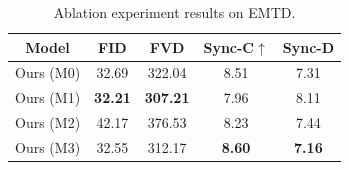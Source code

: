 \begin{table}[t]
        \centering
        \begin{tabular}{c|cccc}
        \toprule
            Model & FID & FVD  & Sync-C$\uparrow$ & Sync-D
            \\
            \midrule
            Ours (M0)       & 32.69 & 322.04 & 8.51 & 7.31 \\
            Ours (M1)       & \textbf{32.21} & \textbf{307.21} & 7.96 & 8.11 \\
            Ours (M2)       & 42.17 & 376.53 & 8.23 & 7.44 \\
            Ours (M3)       & 32.55 & 312.17 & \textbf{8.60} & \textbf{7.16} \\
            \bottomrule
        \end{tabular}
        \caption{
        Ablation experiment results on EMTD.
        }
        \label{tab:ablation}
\end{table} 